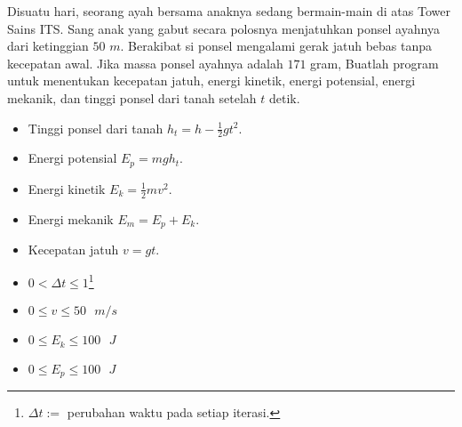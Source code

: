 \documentclass{article}
\begin{document}
\begin{enumerate}[label=\textbf{\arabic*.}]
\begin{center}
        \end{center}
        Disuatu hari, seorang ayah bersama anaknya sedang bermain-main di atas Tower Sains ITS. Sang anak yang gabut secara polosnya menjatuhkan ponsel ayahnya dari ketinggian $50$ $m$. Berakibat si ponsel mengalami gerak jatuh bebas tanpa kecepatan awal. Jika massa ponsel ayahnya adalah $171$ gram, Buatlah program untuk menentukan kecepatan jatuh, energi kinetik, energi potensial, energi mekanik, dan tinggi ponsel dari tanah setelah $t$ detik.
        \begin{hint}
            \begin{itemize}
                \item Tinggi ponsel dari tanah $h_t = h - \frac{1}{2}gt^2$.
                \item Energi potensial $E_p = mgh_t$.
                \item Energi kinetik $E_k = \frac{1}{2}mv^2$.
                \item Energi mekanik $E_m = E_p + E_k$.
                \item Kecepatan jatuh $v = gt$.
            \end{itemize}
        \end{hint}
        \begin{req}
            \begin{itemize}
                \item $0<\Delta t\leq 1$\footnote{$\Delta t:=$ perubahan waktu pada setiap iterasi.}
            \end{itemize}
        \end{req}
        \begin{out}
            \begin{itemize}
                \item $0\leq v\leq 50\text{ }m/s$
                \item $0\leq E_k\leq 100\text{ }J$
                \item $0\leq E_p\leq 100\text{ }J$

\end{itemize}
\end{out}
\end{enumerate}
\end{document}
